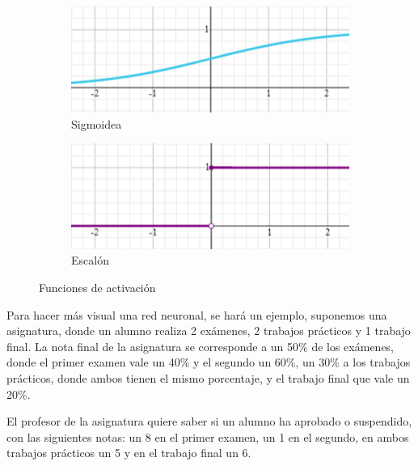\begin{figure}[!ht]
        \vspace{1em}

        \begin{subfigure}{0.45\textwidth}
            \centering
            \includegraphics[width=\textwidth]{img/Sigmoidal.png}
            \caption{Sigmoidea}
            \label{fig:funcionSigmoidal}
        \end{subfigure}
        \begin{subfigure}{0.45\textwidth}
            \centering
            \includegraphics[width=\textwidth]{img/escalon.png}
            \caption{Escalón}
            \label{fig:funcionEscalon}
        \end{subfigure}

        \caption{Funciones de activación}
        \label{fig:funciones_de_activacion}
    \end{figure}

    Para hacer más visual una red neuronal, se hará un ejemplo, suponemos una asignatura, donde un alumno realiza 2 exámenes, 2 trabajos prácticos y 1 trabajo final. La nota final de la asignatura se corresponde a un 50\% de los exámenes, donde el primer examen vale un 40\% y el segundo un 60\%, un 30\% a los trabajos prácticos, donde ambos tienen el mismo porcentaje, y el trabajo final que vale un 20\%. 
    
    El profesor de la asignatura quiere saber si un alumno ha aprobado o suspendido, con las siguientes notas: un 8 en el primer examen, un 1 en el segundo, en ambos trabajos prácticos un 5 y en el trabajo final un 6.


